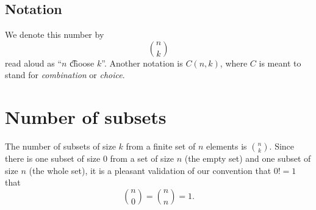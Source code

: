 \subsection*{Notation}

We denote this number by
\[
{n \choose k}
\]
read aloud as ``$n$ \t{choose} $k$''.
Another notation is $C(n,k)$, where $C$ is meant to stand for \textit{combination} or \textit{choice}.

\section*{Number of subsets}

The number of subsets of size $k$ from a finite set of $n$ elements is ${n \choose k}$.
Since there is one subset of size 0 from a set of size $n$ (the empty set) and one subset of size $n$ (the whole set), it is a pleasant validation of our convention that $0! = 1$ that
\[
{n \choose 0} = {n \choose n} = 1.
\]

\blankpage
